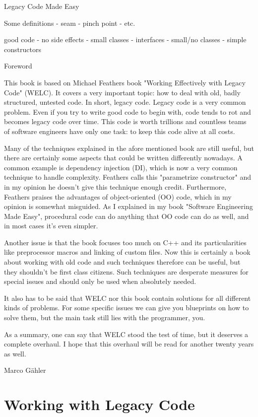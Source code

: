 Legacy Code Made Easy

Some definitions
- seam
- pinch point
- etc.

good code
- no side effects
- small classes
- interfaces
- small/no classes
- simple constructors

Foreword

This book is based on Michael Feathers book "Working Effectively with Legacy Code" (WELC). It covers a very important topic: how to deal with old, badly structured, untested code. In short, legacy code. Legacy code is a very common problem. Even if you try to write good code to begin with, code tends to rot and becomes legacy code over time. This code is worth trillions and countless teams of software engineers have only one task: to keep this code alive at all costs.

Many of the techniques explained in the afore mentioned book are still useful, but there are certainly some aspects that could be written differently nowadays. A common example is dependency injection (DI), which is now a very common technique to handle complexity. Feathers calls this "parametrize constructor" and in my opinion he doesn't give this technique enough credit. Furthermore, Feathers praises the advantages of object-oriented (OO) code, which in my opinion is somewhat misguided. As I explained in my book "Software Engineering Made Easy", procedural code can do anything that OO code can do as well, and in most cases it's even simpler.

Another issue is that the book focuses too much on C++ and its particularities like preprocessor macros and linking of custom files. Now this is certainly a book about working with old code and such techniques therefore can be useful, but they shouldn't be first class citizens. Such techniques are desperate measures for special issues and should only be used when absolutely needed.

It also has to be said that WELC nor this book contain solutions for all different kinds of problems. For some specific issues we can give you blueprints on how to solve them, but the main task still lies with the programmer, you.  

As a summary, one can say that WELC stood the test of time, but it deserves a complete overhaul. I hope that this overhaul will be read for another twenty years as well.

Marco Gähler

\chapter{Working with Legacy Code}

